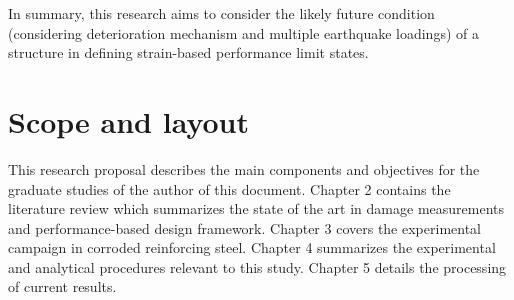 In summary, this research aims to consider the likely future condition (considering deterioration mechanism and multiple earthquake loadings) of a structure in defining strain-based performance limit states.

\section{Scope and layout}
This research proposal describes the main components and objectives for the graduate studies of the author of this document. Chapter 2 contains the literature review which summarizes the state of the art in damage measurements and performance-based design framework. Chapter 3 covers the experimental campaign in corroded reinforcing steel. Chapter 4 summarizes the experimental and analytical procedures relevant to this study. Chapter 5 details the processing of current results. 